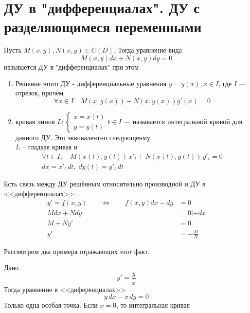 \author{Andrei Tkachuk}

\section{ДУ в "дифференциалах". ДУ с разделяющимеся переменными}

\begin{Def}
    Пусть $M(x, y), N(x, y) \in C(D)$. Тогда уравнение вида
    \[
        M(x, y)dx + N(x, y)dy = 0
    \]
    называется ДУ в "дифференциалах" при этом
    \begin{enumerate}
        \item Решение этого ДУ - дифференциальные  уравнения $y = y(x), x \in I$, где $I$ --- отрезок, причём\\
        \[
            \forall x \in I \quad M(x, y(x)) + N(x, y(x))y'(x) = 0
        \]
        \item кривая линия $L : 
        \begin{cases}
            x = x(t)\\
            y = y(t)    
        \end{cases} t \in I$ --- называется интегральной кривой для данного ДУ. Это эквивалентно следующенму\\
        $L$ -- гладкая кривая и 
        \begin{multline*}
            \forall t \in I, \quad M(x(t), y(t))\,x'_t + N(x(t), y(t))\,y'_t = 0\\
            dx = x'_t\,dt, \; dy(t) = y'_t\,dt
        \end{multline*}
    \end{enumerate}
\end{Def}

\begin{Note}
    Есть связь между ДУ решённым относительно производной и ДУ в <<дифференциалах>>
    \begin{align*}
        y' = f(x, y) \qquad \Leftrightarrow \qquad f(x, y)dx - dy &= 0\\
        Mdx + Ndy &= 0 | \div dx\\
        M + Ny' &= 0\\
        y' &= -\frac{M}{N}
    \end{align*}
\end{Note}

Рассмотрим два примера отражающих этот факт.

\begin{Example}
    Дано
    \[
        y' = \frac{y}{x}
    \]
    Тогда уравнение в <<диференциалах>>
    \[
        y\,dx - x\,dy = 0
    \]
    Только одна особая точка. Если $x = 0$, то интегральная кривая
\end{Example}

